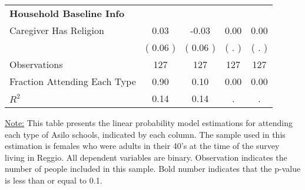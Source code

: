 \begin{table}[H]
{\begin{tabular}{lcccc}
\midrule
\textbf{Household Baseline Info} \\
\quad Caregiver Has Religion &      0.03 &     -0.03 &      0.00 &      0.00 \\
\quad  & (     0.06 ) & (     0.06 )  & (        . )  & (        . )  \\
\midrule
Observations & 127 & 127 & 127 & 127 \\
Fraction Attending Each Type &      0.90 &      0.10 &      0.00 &      0.00 \\
\midrule
$ R^2$ &      0.14 &      0.14 &         . &         . \\
\bottomrule
\end{tabular}}
\end{table}
\begin{footnotesize}
\noindent\underline{Note:} This table presents the linear probability model estimations for attending each type of Asilo schools, indicated by each column. The sample used in this estimation is females who were adults in their 40's at the time of the survey living in Reggio. All dependent variables are binary. Observation indicates the number of people included in this sample. Bold number indicates that the p-value is less than or equal to 0.1.
\end{footnotesize}
